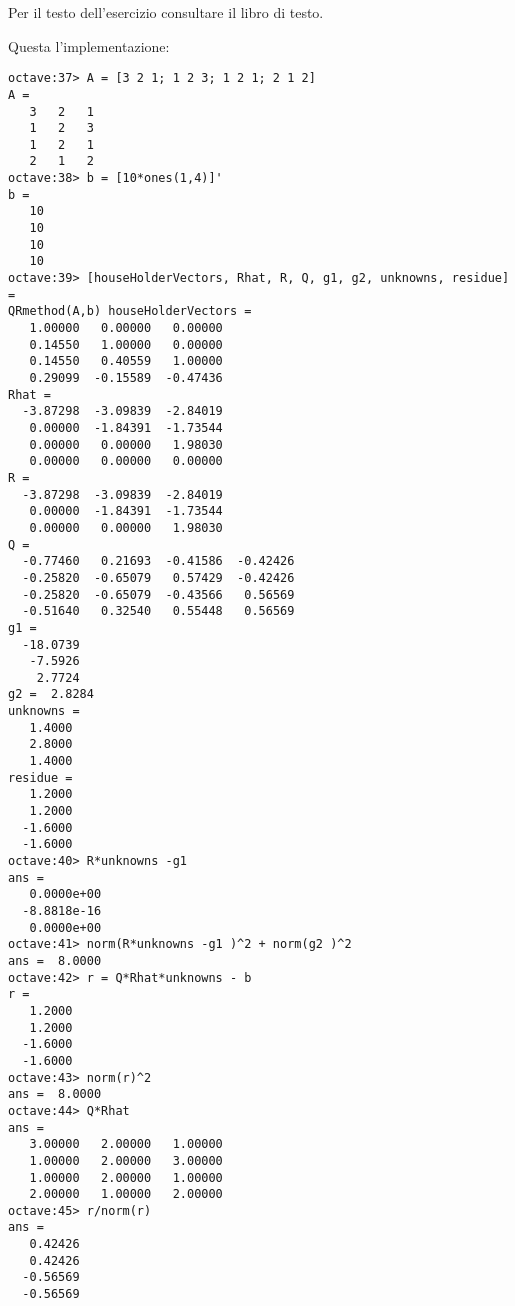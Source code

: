 \begin{exercise}[3.31]
Per il testo dell'esercizio consultare il libro di testo.
\end{exercise}
Questa l'implementazione:
\begin{lstlisting}
octave:37> A = [3 2 1; 1 2 3; 1 2 1; 2 1 2]
A =
   3   2   1
   1   2   3
   1   2   1
   2   1   2
octave:38> b = [10*ones(1,4)]'
b =
   10
   10
   10
   10
octave:39> [houseHolderVectors, Rhat, R, Q, g1, g2, unknowns, residue] =
QRmethod(A,b) houseHolderVectors =
   1.00000   0.00000   0.00000
   0.14550   1.00000   0.00000
   0.14550   0.40559   1.00000
   0.29099  -0.15589  -0.47436
Rhat =
  -3.87298  -3.09839  -2.84019
   0.00000  -1.84391  -1.73544
   0.00000   0.00000   1.98030
   0.00000   0.00000   0.00000
R =
  -3.87298  -3.09839  -2.84019
   0.00000  -1.84391  -1.73544
   0.00000   0.00000   1.98030
Q =
  -0.77460   0.21693  -0.41586  -0.42426
  -0.25820  -0.65079   0.57429  -0.42426
  -0.25820  -0.65079  -0.43566   0.56569
  -0.51640   0.32540   0.55448   0.56569
g1 =
  -18.0739
   -7.5926
    2.7724
g2 =  2.8284
unknowns =
   1.4000
   2.8000
   1.4000
residue =
   1.2000
   1.2000
  -1.6000
  -1.6000
octave:40> R*unknowns -g1 
ans =
   0.0000e+00
  -8.8818e-16
   0.0000e+00
octave:41> norm(R*unknowns -g1 )^2 + norm(g2 )^2
ans =  8.0000
octave:42> r = Q*Rhat*unknowns - b
r =
   1.2000
   1.2000
  -1.6000
  -1.6000
octave:43> norm(r)^2
ans =  8.0000
octave:44> Q*Rhat
ans =
   3.00000   2.00000   1.00000
   1.00000   2.00000   3.00000
   1.00000   2.00000   1.00000
   2.00000   1.00000   2.00000
octave:45> r/norm(r)
ans =
   0.42426
   0.42426
  -0.56569
  -0.56569
\end{lstlisting}
 
